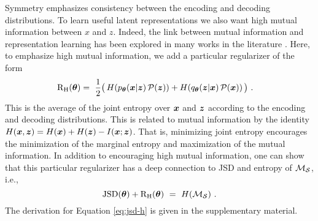 Symmetry emphasizes consistency between the encoding and decoding distributions.
To learn useful latent representations we also want high mutual information 
between $x$ and $z$.
Indeed, the link between mutual information and representation learning has been explored
in many works in the literature \citep{hjelm2018learning,Hjelm2018,Chen2016}.
Here, to emphasize high mutual information, we add a particular regularizer of the form
\begin{align}
    \mathrm{R}_\mathrm{H}({\boldsymbol \theta}) &= ~\frac{1}{2} \big( \, H(p_{{\boldsymbol \theta}}({\boldsymbol{x}} | {\boldsymbol z})\, \mathcal{P}({\boldsymbol z})) + H(q_{{\boldsymbol \theta}}({\boldsymbol z} | {\boldsymbol{x}})\, \mathcal{P}({\boldsymbol{x}})) \, \big) 
    ~ .
    \label{eq:mi-regularizer}
\end{align}
This is the average of the joint entropy over ${\boldsymbol{x}}$ and ${\boldsymbol z}$ according
to the encoding and decoding distributions. This is related to mutual
information by the identity $H({\boldsymbol{x}}, {\boldsymbol z}) = H({\boldsymbol{x}}) + H({\boldsymbol z}) - I({\boldsymbol{x}}; {\boldsymbol z})$.
That is, minimizing joint entropy encourages the minimization of the marginal entropy
and maximization of the mutual information. 
In addition to encouraging high mutual information, one can show that this
particular regularizer has a deep connection to JSD and entropy of $\mathcal{M}_{\mathcal{S}}$, i.e., 
\begin{equation}
    \mathrm{JSD}({\boldsymbol \theta}) + \mathrm{R}_\mathrm{H}({\boldsymbol \theta}) ~=~ H(\mathcal{M}_{\mathcal{S}}) ~.
    \label{eq:jsd-h}
\end{equation}
The derivation for Equation \eqref{eq:jsd-h} is
given in the supplementary material.
